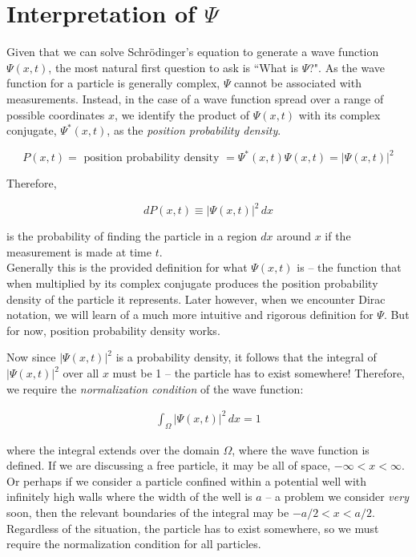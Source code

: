 \section{Interpretation of $\Psi$}

Given that we can solve Schr\"odinger's equation to generate a wave function
$\Psi(x, t)$, the most natural first question to ask is ``What is $\Psi$?". As
the wave function for a particle is generally complex, $\Psi$ cannot be
associated with measurements. Instead, in the case of a wave function spread
over a range of possible coordinates $x$, we identify the product of $\Psi(x,
t)$ with its complex conjugate, $\Psi^*(x, t)$, as the \textit{position
probability density}. 

\[
P(x, t) = \text{ position probability density } = \Psi^*(x, t)\Psi(x, t)
= |\Psi(x, t)|^2
\] \vspace{3px}

Therefore, 

\[
dP(x, t) \equiv |\Psi(x, t)|^2\,dx \] \vspace{3px}

is the probability of finding the particle in a region $dx$ around $x$ if the
measurement is made at time $t$. \\ 

Generally this is the provided definition for what $\Psi(x, t)$ is -- the
function that when multiplied by its complex conjugate produces the position
probability density of the particle it represents. Later however, when we
encounter Dirac notation, we will learn of a much more intuitive and rigorous
definition for $\Psi$. But for now, position probability density works. 

Now since $|\Psi(x, t)|^2$ is a probability density, it follows that the
integral of $|\Psi(x, t)|^2$ over all $x$ must be 1 -- the particle has to
exist somewhere! Therefore, we require the \textit{normalization condition} of
the wave function: 

\begin{align} \label{eq:normalization}
  \int_\Omega |\Psi(x, t)|^2 \, dx = 1
\end{align}

where the integral extends over the domain $\Omega$, where the wave function is
defined. If we are discussing a free particle, it may be all of space,
$-\infty < x < \infty$. Or perhaps if we consider a particle confined within
a potential well with infinitely high walls where the width of the well is $a$
-- a problem we consider \textit{very} soon, then the relevant
boundaries of the integral may be $-a/2 < x < a/2$. Regardless of the
situation, the particle has to exist somewhere, so we must require the
normalization condition for all particles. 

